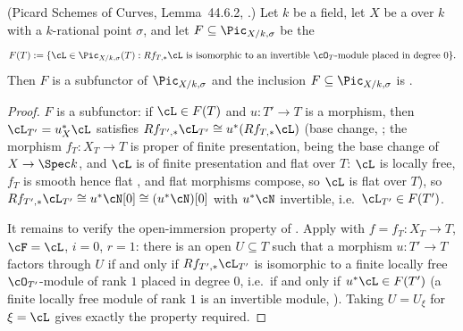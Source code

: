 \begin{lemma}\label{lem:pc-f-open-subfunctor}
(Picard Schemes of Curves, Lemma~44.6.2,
.)
Let $k$ be a field, let $X$ be a
 over
$k$ with a $k$-rational point $\sigma$, and let
$F\subseteq\Pic_{X/k,\sigma}$ be the
\[
F(T):=\{\cL\in\Pic_{X/k,\sigma}(T):Rf_{T,*}\cL\text{ is isomorphic to an
invertible }\cO_T\text{-module placed in degree }0\}.
\]
Then $F$ is a subfunctor of $\Pic_{X/k,\sigma}$ and the inclusion
$F\subseteq\Pic_{X/k,\sigma}$ is
.
\end{lemma}
\begin{proof}
$F$ is a subfunctor: if $\cL\in F(T)$ and $u:T'\to T$ is a morphism, then
$\cL_{T'}=u_X^*\cL$ satisfies
$Rf_{T',*}\cL_{T'}\cong u^*(Rf_{T,*}\cL)$ (base change, ;
the morphism $f_T:X_T\to T$ is proper of finite presentation, being the
base change of $X\to\Spec k$, and $\cL$ is of finite presentation and
flat over $T$: $\cL$ is locally free, $f_T$ is smooth hence flat
, and flat morphisms compose, so $\cL$ is flat
over $T$), so $Rf_{T',*}\cL_{T'}\cong u^*\cN[0]\cong(u^*\cN)[0]$ with
$u^*\cN$ invertible, i.e.\ $\cL_{T'}\in F(T')$.

It remains to verify the open-immersion property of
.  Apply  with
$f=f_T:X_T\to T$, $\cF=\cL$, $i=0$, $r=1$: there is an open $U\subseteq T$
such that a morphism $u:T'\to T$ factors through $U$ if and only if
$Rf_{T',*}\cL_{T'}$ is isomorphic to a finite locally free
$\cO_{T'}$-module of rank $1$ placed in degree $0$, i.e.\ if and only if
$u^*\cL\in F(T')$ (a finite locally free module of rank $1$ is an
invertible module, ).  Taking $U=U_\xi$
for $\xi=\cL$ gives exactly the property required.
\end{proof}

